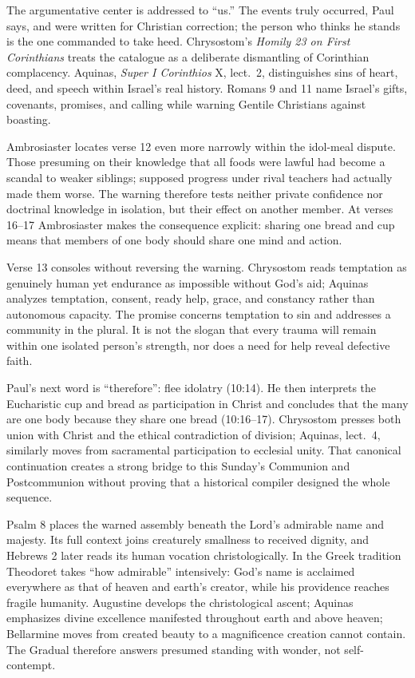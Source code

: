 \begin{deepstudy}
The argumentative center is addressed to ``us.'' The events truly occurred, Paul says, and were written for Christian correction; the person who thinks he stands is the one commanded to take heed. Chrysostom's \emph{Homily 23 on First Corinthians} treats the catalogue as a deliberate dismantling of Corinthian complacency. Aquinas, \emph{Super I Corinthios} X, lect.~2, distinguishes sins of heart, deed, and speech within Israel's real history. Romans 9 and 11 name Israel's gifts, covenants, promises, and calling while warning Gentile Christians against boasting.

Ambrosiaster locates verse 12 even more narrowly within the idol-meal dispute. Those presuming on their knowledge that all foods were lawful had become a scandal to weaker siblings; supposed progress under rival teachers had actually made them worse. The warning therefore tests neither private confidence nor doctrinal knowledge in isolation, but their effect on another member. At verses 16--17 Ambrosiaster makes the consequence explicit: sharing one bread and cup means that members of one body should share one mind and action.

Verse 13 consoles without reversing the warning. Chrysostom reads temptation as genuinely human yet endurance as impossible without God's aid; Aquinas analyzes temptation, consent, ready help, grace, and constancy rather than autonomous capacity. The promise concerns temptation to sin and addresses a community in the plural. It is not the slogan that every trauma will remain within one isolated person's strength, nor does a need for help reveal defective faith.

Paul's next word is ``therefore'': flee idolatry (10:14). He then interprets the Eucharistic cup and bread as participation in Christ and concludes that the many are one body because they share one bread (10:16--17). Chrysostom presses both union with Christ and the ethical contradiction of division; Aquinas, lect.~4, similarly moves from sacramental participation to ecclesial unity. That canonical continuation creates a strong bridge to this Sunday's Communion and Postcommunion without proving that a historical compiler designed the whole sequence.

Psalm 8 places the warned assembly beneath the Lord's admirable name and majesty. Its full context joins creaturely smallness to received dignity, and Hebrews 2 later reads its human vocation christologically. In the Greek tradition Theodoret takes ``how admirable'' intensively: God's name is acclaimed everywhere as that of heaven and earth's creator, while his providence reaches fragile humanity. Augustine develops the christological ascent; Aquinas emphasizes divine excellence manifested throughout earth and above heaven; Bellarmine moves from created beauty to a magnificence creation cannot contain. The Gradual therefore answers presumed standing with wonder, not self-contempt.


\end{deepstudy}
